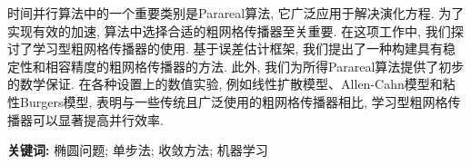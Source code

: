 \vspace*{-8mm}
\begin{center}
	 {}
\end{center}
\renewcommand\baselinestretch{1.5} 

{时间并行算法中的一个重要类别是Parareal算法, 它广泛应用于解决演化方程. 为了实现有效的加速, 算法中选择合适的粗网格传播器至关重要. 在这项工作中, 我们探讨了学习型粗网格传播器的使用. 基于误差估计框架, 我们提出了一种构建具有稳定性和相容精度的粗网格传播器的方法. 此外, 我们为所得Parareal算法提供了初步的数学保证. 在各种设置上的数值实验, 例如线性扩散模型、Allen-Cahn模型和粘性Burgers模型, 表明与一些传统且广泛使用的粗网格传播器相比, 学习型粗网格传播器可以显著提高并行效率. 

\vskip5mm

{\textbf{关键词:}} 椭圆问题; 单步法; 收敛方法; 机器学习}
